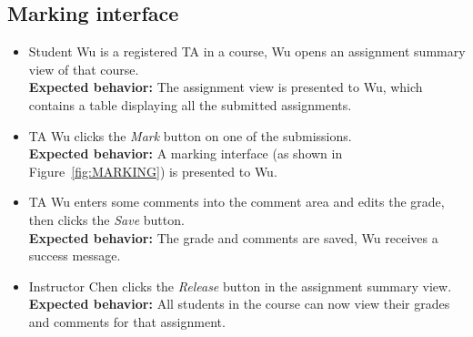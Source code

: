 \subsection{Marking interface}
\begin{itemize}
    \item Student Wu is a registered TA in a course, Wu opens an assignment
        summary view of that course. \\
    {\bf Expected behavior:} The assignment view is presented to Wu, which
        contains a table displaying all the submitted assignments.

    \item TA Wu clicks the \emph{Mark} button on one of the submissions.\\
    {\bf Expected behavior:} A marking interface (as shown in
    Figure~\ref{fig:MARKING}) is presented to Wu.

    \item TA Wu enters some comments into the comment area and edits the
        grade, then clicks the \emph{Save} button. \\
    {\bf Expected behavior:} The grade and comments are saved, Wu receives
        a success message.

    \item Instructor Chen clicks the \emph{Release} button in the assignment
        summary view. \\
    {\bf Expected behavior:} All students in the course can now view their
        grades and comments for that assignment.
\end{itemize}
